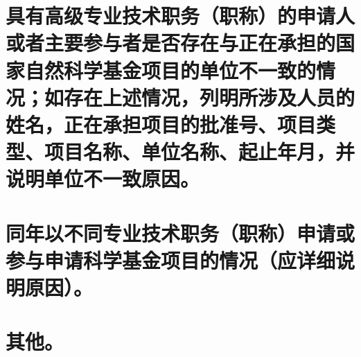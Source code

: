 \documentclass[UTF8, punct, oneside,fontset=none]{ctexbook}
\begin{document}
\begin{MS}
	
\end{MS}

\section{具有高级专业技术职务\kg{0.3em}（职称）\kg{0.3em}的申请人或者主要参与者是否存在与正在承担的国家自然科学基金项目的单位不一致的情况；如存在上述情况，列明所涉及人员的姓名，正在承担项目的批准号、项目类型、项目名称、单位名称、起止年月，并说明单位不一致原因。}

\begin{MS}
	
\end{MS}

\section{同年以不同专业技术职务\kg{0.3em}（职称）\kg{0.3em}申请或参与申请科学基金项目的情况（应详细说明原因）。}

\begin{MS}
	
\end{MS}

\section{其他。}

\begin{MS}
	
\end{MS}
\end{document}
